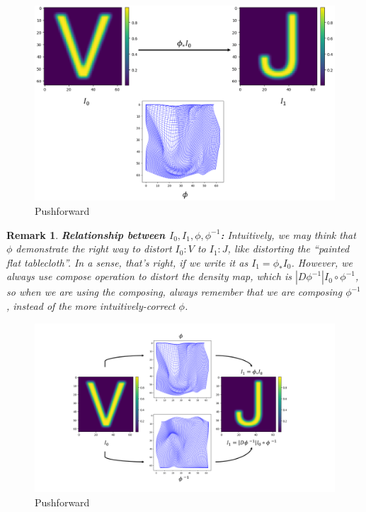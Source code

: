 \documentclass[a4paper]{article}
\theoremstyle{definition}
\theoremstyle{plain}
\newtheorem{remark}{Remark}
\begin{document}
\begin{figure}[H]
\centering
\includegraphics[scale=0.15]{figure/pushforwardphi.png}
\caption{Pushforward}
\end{figure}

\begin{remark}
\textbf{Relationship between $I_0, I_1, \phi, \phi^{-1}$:}
Intuitively, we may think that $\phi$ demonstrate the right way to distort $I_0:V$ to $I_1:J$, like distorting the ``painted flat tablecloth''. In a sense, that's right, if we write it as $I_1=\phi_*I_0$. However, we always use compose operation to distort the density map, which is $|D\phi^{-1}|I_0\circ\phi^{-1}$, so when we are using the composing, always remember that we are composing $\phi^{-1}$, instead of the more intuitively-correct $\phi$.
\end{remark}

\begin{figure}[H]
\centering
\includegraphics[scale=0.11]{figure/pushforward.png}
\caption{Pushforward}
\end{figure}
\end{document}
